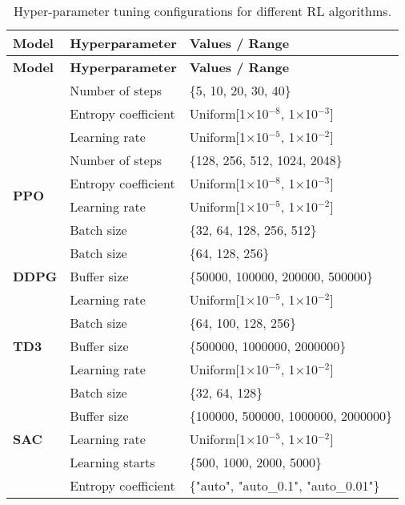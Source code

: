 \begin{longtable}{|l|l|p{8cm}|}
    \caption{Hyper-parameter tuning configurations for different RL algorithms.}
    \label{tab:model_hyperparameters}
    \\ 
    \hline
    \textbf{Model} & \textbf{Hyperparameter} & \textbf{Values / Range} \\ \midrule
    \endfirsthead

    \hline
    \textbf{Model} & \textbf{Hyperparameter} & \textbf{Values / Range} \\ \midrule
    \endhead

    \endfoot

    \multirow{3}{*}{\textbf{A2C}}
    & Number of steps & \{5, 10, 20, 30, 40\} \\
    & Entropy coefficient & Uniform[1$\times$10$^{-8}$, 1$\times$10$^{-3}$] \\ 
    & Learning rate & Uniform[1$\times$10$^{-5}$, 1$\times$10$^{-2}$] \\ \hline

    \multirow{4}{*}{\textbf{PPO}}
    & Number of steps & \{128, 256, 512, 1024, 2048\} \\ 
    & Entropy coefficient & Uniform[1$\times$10$^{-8}$, 1$\times$10$^{-3}$] \\ 
    & Learning rate & Uniform[1$\times$10$^{-5}$, 1$\times$10$^{-2}$] \\ 
    & Batch size & \{32, 64, 128, 256, 512\} \\ \hline

    \multirow{3}{*}{\textbf{DDPG}}
    & Batch size & \{64, 128, 256\} \\ 
    & Buffer size & \{50000, 100000, 200000, 500000\} \\ 
    & Learning rate & Uniform[1$\times$10$^{-5}$, 1$\times$10$^{-2}$] \\ \hline

    \multirow{3}{*}{\textbf{TD3}}
    & Batch size & \{64, 100, 128, 256\} \\ 
    & Buffer size & \{500000, 1000000, 2000000\} \\ 
    & Learning rate & Uniform[1$\times$10$^{-5}$, 1$\times$10$^{-2}$] \\ \hline

    \multirow{5}{*}{\textbf{SAC}}
    & Batch size & \{32, 64, 128\} \\ 
    & Buffer size & \{100000, 500000, 1000000, 2000000\} \\ 
    & Learning rate & Uniform[1$\times$10$^{-5}$, 1$\times$10$^{-2}$] \\ 
    & Learning starts & \{500, 1000, 2000, 5000\} \\ 
    & Entropy coefficient & \{"auto", "auto\_0.1", "auto\_0.01"\} \\ \hline
\end{longtable}